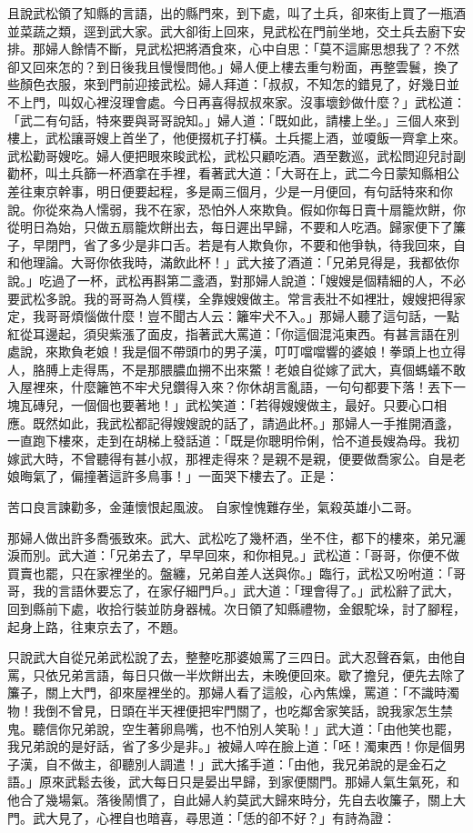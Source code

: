 \begin{showcontents}{}
且說武松領了知縣的言語，出的縣門來，到下處，叫了土兵，卻來街上買了一瓶酒並菜蔬之類，逕到武大家。武大卻街上回來，見武松在門前坐地，交土兵去廚下安排。那婦人餘情不斷，見武松把將酒食來，心中自思：「莫不這廝思想我了？不然卻又回來怎的？到日後我且慢慢問他。」婦人便上樓去重勻粉面，再整雲鬟，換了些顏色衣服，來到門前迎接武松。婦人拜道：「叔叔，不知怎的錯見了，好幾日並不上門，叫奴心裡沒理會處。今日再喜得叔叔來家。沒事壞鈔做什麼？」武松道： 「武二有句話，特來要與哥哥說知。」婦人道：「既如此，請樓上坐。」三個人來到樓上，武松讓哥嫂上首坐了，他便掇杌子打橫。土兵擺上酒，並嗄飯一齊拿上來。武松勸哥嫂吃。婦人便把眼來睃武松，武松只顧吃酒。酒至數巡，武松問迎兒討副勸杯，叫土兵篩一杯酒拿在手裡，看著武大道：「大哥在上，武二今日蒙知縣相公差往東京幹事，明日便要起程，多是兩三個月，少是一月便回，有句話特來和你說。你從來為人懦弱，我不在家，恐怕外人來欺負。假如你每日賣十扇籠炊餅，你從明日為始，只做五扇籠炊餅出去，每日遲出早歸，不要和人吃酒。歸家便下了簾子，早閉門，省了多少是非口舌。若是有人欺負你，不要和他爭執，待我回來，自和他理論。大哥你依我時，滿飲此杯！」武大接了酒道：「兄弟見得是，我都依你說。」吃過了一杯，武松再斟第二盞酒，對那婦人說道：「嫂嫂是個精細的人，不必要武松多說。我的哥哥為人質樸，全靠嫂嫂做主。常言表壯不如裡壯，嫂嫂把得家定，我哥哥煩惱做什麼！豈不聞古人云：籬牢犬不入。」那婦人聽了這句話，一點紅從耳邊起，須臾紫漲了面皮，指著武大罵道：「你這個混沌東西。有甚言語在別處說，來欺負老娘！我是個不帶頭巾的男子漢，叮叮噹噹響的婆娘！拳頭上也立得人，胳膊上走得馬，不是那腲膿血搠不出來鱉！老娘自從嫁了武大，真個螞蟻不敢入屋裡來，什麼籬笆不牢犬兒鑽得入來？你休胡言亂語，一句句都要下落！丟下一塊瓦磚兒，一個個也要著地！」武松笑道：「若得嫂嫂做主，最好。只要心口相應。既然如此，我武松都記得嫂嫂說的話了，請過此杯。」那婦人一手推開酒盞，一直跑下樓來，走到在胡梯上發話道：「既是你聰明伶俐，恰不道長嫂為母。我初嫁武大時，不曾聽得有甚小叔，那裡走得來？是親不是親，便要做喬家公。自是老娘晦氣了，偏撞著這許多鳥事！」一面哭下樓去了。正是：

苦口良言諫勸多，金蓮懷恨起風波。
自家惶愧難存坐，氣殺英雄小二哥。

那婦人做出許多喬張致來。武大、武松吃了幾杯酒，坐不住，都下的樓來，弟兄灑淚而別。武大道：「兄弟去了，早早回來，和你相見。」武松道：「哥哥，你便不做買賣也罷，只在家裡坐的。盤纏，兄弟自差人送與你。」臨行，武松又吩咐道：「哥哥，我的言語休要忘了，在家仔細門戶。」武大道：「理會得了。」武松辭了武大，回到縣前下處，收拾行裝並防身器械。次日領了知縣禮物，金銀駝垛，討了腳程，起身上路，往東京去了，不題。

只說武大自從兄弟武松說了去，整整吃那婆娘罵了三四日。武大忍聲吞氣，由他自罵，只依兄弟言語，每日只做一半炊餅出去，未晚便回來。歇了擔兒，便先去除了簾子，關上大門，卻來屋裡坐的。那婦人看了這般，心內焦燥，罵道：「不識時濁物！我倒不曾見，日頭在半天裡便把牢門關了，也吃鄰舍家笑話，說我家怎生禁鬼。聽信你兄弟說，空生著卵鳥嘴，也不怕別人笑恥！」武大道：「由他笑也罷，我兄弟說的是好話，省了多少是非。」被婦人啐在臉上道：「呸！濁東西！你是個男子漢，自不做主，卻聽別人調遣！」武大搖手道：「由他，我兄弟說的是金石之語。」原來武鬆去後，武大每日只是晏出早歸，到家便關門。那婦人氣生氣死，和他合了幾場氣。落後鬧慣了，自此婦人約莫武大歸來時分，先自去收簾子，關上大門。武大見了，心裡自也暗喜，尋思道：「恁的卻不好？」有詩為證：


\end{showcontents}
